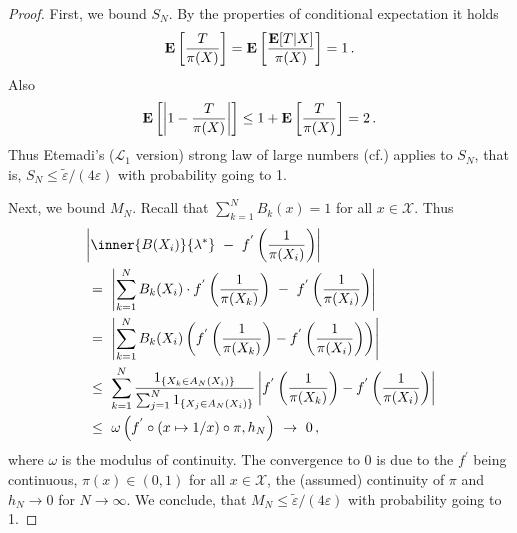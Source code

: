 \begin{proof}
First, we bound $S_N$.
By the properties of conditional expectation it holds
\begin{gather*}
  \mathbf{E}
  \left[ 
    \frac{T}{\pi(X)}
  \right]
  =
  \mathbf{E}
  \left[ 
    \frac{\mathbf{E}[T|X]}{\pi(X)}
  \right]
  =1
  \,.
\end{gather*}
Also
\begin{gather}
  \mathbf{E}
  \left[ 
    \left| 
    1
    -
    \frac{T}{\pi(X)}
    \right|
  \right]
  \le
  1
  +
  \mathbf{E}
  \left[ 
    \frac{T}{\pi(X)}
  \right]
  =
  2
  \,.
\end{gather}
Thus Etemadi's ($\mathcal{L}_1$ version) strong law of large numbers (cf.\cite[Theorem~5.17]{Klenke2020}) applies
to $S_N$, that is,
$S_N \le 
\tilde{\varepsilon}
/
(4\varepsilon)
$
with probability going to 1.

Next, we bound $M_N$.
Recall that $\sum_{k=1}^{N}B_k(x)=1$ for all $x\in\mathcal{X}$. Thus
\begin{align*}
  &
\left| 
        \inner
       {B(X_i)}
       {\lambda^*}
       \ 
        -
        \ 
        f^{'}
        \left( 
          \frac{1}{\pi(X_i)}
     \right)
\right|
      \\
      &
      \ 
      =
      \ 
      \left| 
      \sum_{k=1}^{N} 
      B_k(X_i)
      \cdot
        f^{'}
        \left( 
          \frac{1}{\pi(X_k)}
          \right)
      \ 
      -
      \ 
        f^{'}
        \left( 
          \frac{1}{\pi(X_i)}
     \right)
      \right|
      \\
      &
      \ 
      =
      \ 
      \left| 
      \sum_{k=1}^{N} 
      B_k(X_i)
      \left( 
        f^{'}
        \left( 
          \frac{1}{\pi(X_k)}
     \right)
     -
        f^{'}
        \left( 
          \frac{1}{\pi(X_i)}
     \right)
      \right)
      \right|
      \\
      &
      \ 
      \le
      \ 
      \sum_{k=1}^{N} 
      \frac{1_{\left\{ X_k\in A_N(X_i) \right\}}}
      {
        \sum_{j=1}^{N} 
1_{\left\{ X_j\in A_N(X_i) \right\}}
      }
      \left| 
        f^{'}
        \left( 
          \frac{1}{\pi(X_k)}
     \right)
     -
        f^{'}
        \left( 
          \frac{1}{\pi(X_i)}
     \right)
      \right|
      \\
      &
      \ 
      \le
      \ 
      \omega
      \left( f^{'}\circ (x\mapsto1/x)\circ \pi,h_N \right)
      \ 
      \to
      \ 
      0
      \,,
\end{align*}
where $\omega$ is the modulus of continuity.
The convergence to 0 is due to the $f^{'}$ being continuous, $\pi(x)\in(0,1)$ for all $x\in\mathcal{X}$, the (assumed) continuity of $\pi$ and $h_N\to 0$ for $N\to\infty$.
We conclude, that $
M_N\le
\tilde{\varepsilon}
/
(4\varepsilon)
$
with probability going to 1.


\end{proof}
